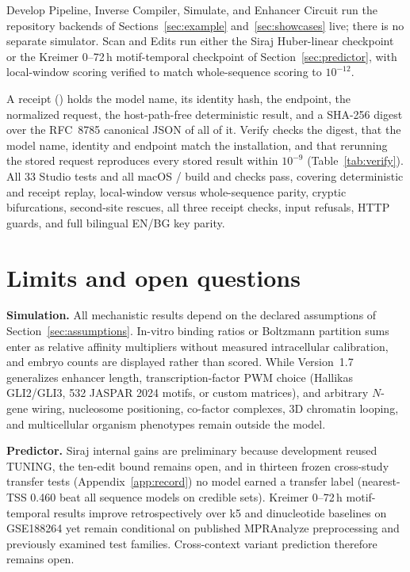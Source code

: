 \documentclass[10.5pt,a4paper]{article}
\begin{document}
Develop Pipeline, Inverse Compiler, Simulate, and Enhancer Circuit run the repository backends of Sections~\ref{sec:example} and~\ref{sec:showcases} live; there is no separate simulator. Scan and Edits run either the Siraj Huber-linear checkpoint or the Kreimer 0--72\,h motif-temporal checkpoint of Section~\ref{sec:predictor}, with local-window scoring verified to match whole-sequence scoring to $10^{-12}$.

A receipt () holds the model name, its identity hash, the endpoint, the normalized request, the host-path-free deterministic result, and a SHA-256 digest over the RFC~8785 canonical JSON of all of it. Verify checks the digest, that the model name, identity and endpoint match the installation, and that rerunning the stored request reproduces every stored result within $10^{-9}$ (Table~\ref{tab:verify}). All 33 Studio tests and all macOS / build and  checks pass, covering deterministic  and  receipt replay, local-window versus whole-sequence parity, cryptic bifurcations, second-site rescues, all three receipt checks, input refusals, HTTP guards, and full bilingual EN/BG key parity.

\section{Limits and open questions}\label{sec:limits}

\textbf{Simulation.} All mechanistic results depend on the declared assumptions of Section~\ref{sec:assumptions}. In-vitro binding ratios or Boltzmann partition sums enter as relative affinity multipliers without measured intracellular calibration, and embryo counts \citep{peterson2012} are displayed rather than scored. While Version~1.7 generalizes enhancer length, transcription-factor PWM choice (Hallikas GLI2/GLI3, 532 JASPAR 2024 motifs, or custom matrices), and arbitrary $N$-gene  wiring, nucleosome positioning, co-factor complexes, 3D chromatin looping, and multicellular organism phenotypes remain outside the model.

\textbf{Predictor.} Siraj internal gains are preliminary because development reused TUNING, the ten-edit bound remains open, and in thirteen frozen cross-study transfer tests (Appendix~\ref{app:record}) no model earned a transfer label (nearest-TSS 0.460 beat all sequence models on credible sets). Kreimer 0--72\,h motif-temporal results improve retrospectively over k5 and dinucleotide baselines on GSE188264 yet remain conditional on published MPRAnalyze preprocessing and previously examined test families. Cross-context variant prediction therefore remains open.
\end{document}

